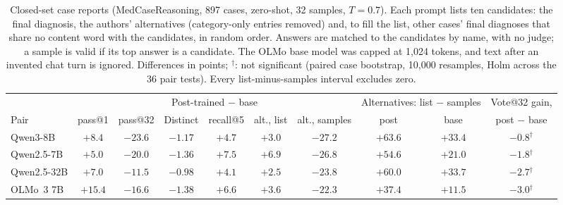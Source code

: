 \documentclass[11pt]{article}
\begin{document}
\begin{table}[t]
\medskip
\begin{adjustbox}{max width=\linewidth}
\begin{tabular}{lccccccccc}
\toprule
 & \multicolumn{6}{c}{Post-trained $-$ base} & \multicolumn{2}{c}{Alternatives: list $-$ samples} & Vote@32 gain, \\
Pair & pass@1 & pass@32 & Distinct & recall@5 & alt., list & alt., samples & post & base & post $-$ base \\
\midrule
Qwen3-8B & $+8.4$ & $-23.6$ & $-1.17$ & $+4.7$ & $+3.0$ & $-27.2$ & $+63.6$ & $+33.4$ & $-0.8$$^{\dagger}$ \\
Qwen2.5-7B & $+5.0$ & $-20.0$ & $-1.36$ & $+7.5$ & $+6.9$ & $-26.8$ & $+54.6$ & $+21.0$ & $-1.8$$^{\dagger}$ \\
Qwen2.5-32B & $+7.0$ & $-11.5$ & $-0.98$ & $+4.1$ & $+2.5$ & $-23.8$ & $+60.0$ & $+33.7$ & $-2.7$$^{\dagger}$ \\
OLMo~3 7B & $+15.4$ & $-16.6$ & $-1.38$ & $+6.6$ & $+3.6$ & $-22.3$ & $+37.4$ & $+11.5$ & $-3.0$$^{\dagger}$ \\
\bottomrule
\end{tabular}
\end{adjustbox}
\caption{Closed-set case reports (MedCaseReasoning, 897 cases, zero-shot, 32 samples, $T{=}0.7$). Each prompt lists ten candidates: the final diagnosis, the authors' alternatives (category-only entries removed) and, to fill the list, other cases' final diagnoses that share no content word with the candidates, in random order. Answers are matched to the candidates by name, with no judge; a sample is valid if its top answer is a candidate. The OLMo base model was capped at 1,024 tokens, and text after an invented chat turn is ignored. Differences in points; $^{\dagger}$: not significant (paired case bootstrap, 10,000 resamples, Holm across the 36 pair tests). Every list-minus-samples interval excludes zero.}
\label{tab:closedcase}
\end{table}
\end{document}
